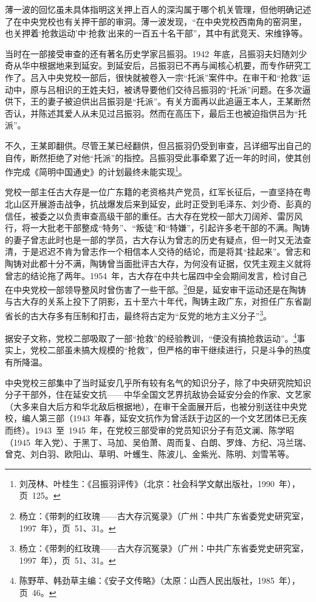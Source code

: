 薄一波的回忆虽未具体指明这关押上百人的深沟属于哪个机关管理，但他明确记述了在中央党校也有关押干部的审洞。薄一波发现，“在中央党校西南角的窑洞里，也关押着‘抢救运动’中‘抢救’出来的一百五十名干部”，其中有武竞天、宋维铮等。

当时在一部接受审查的还有著名历史学家吕振羽。1942~年底，吕振羽夫妇随刘少奇从华中根据地来到延安。到延安后，吕振羽已不再与闻核心机要，而专作研究工作了。吕入中央党校一部后，很快就被卷入一宗“托派”案件中。在审干和“抢救”运动中，原与吕相识的王姓夫妇，被诱导要他们交待吕振羽的“托派”问题。在多次逼供下，王的妻子被迫供出吕振羽是“托派”。有关方面再以此追逼王本人，王某断然否认，并陈述其爱人从未见过吕振羽。然而在高压下，最后王也被迫指供吕为“托派”。

不久，王某即翻供。尽管王某已经翻供，但吕振羽仍受到审查，吕详细写出自己的自传，断然拒绝了对他“托派”的指控。吕振羽受此事牵累了近一年的时间，使其创作完成《简明中国通史》的计划最终未能实现\footnote{刘茂林、叶桂生：《吕振羽评传》（北京：社会科学文献出版社，1990~年），页~125。}。

党校一部主任古大存是一位广东籍的老资格共产党员，红军长征后，一直坚持在粤北山区开展游击战争，抗战爆发后来到延安，此时正受到毛泽东、刘少奇、彭真的信任，被委之以负责审查高级干部的重任。古大存在党校一部大刀阔斧、雷厉风行，将一大批老干部整成“特务”、“叛徒”和“特嫌”，引起许多老干部的不满。陶铸的妻子曾志此时也是一部的学员，古大存认为曾志的历史有疑点，但一时又无法查清，于是迟迟不肯为曾志作一个相信本人交待的结论，而是将其“挂起来”。曾志和陶铸对此都十分不满，陶铸曾当面批评古大存，为何没有证据，仅凭主观主义就将曾志的结论拖了两年。1954~年，古大存在中共七届四中全会期间发言，检讨自己在中央党校一部领导整风时曾伤害了一些干部。\footnote{杨立：《带刺的红玫瑰——古大存沉冤录》（广州：中共广东省委党史研究室，1997~年），页~51、31。}但是，延安审干运动还是在陶铸与古大存的关系上投下了阴影，五十至六十年代，陶铸主政广东，对担任广东省副省长的古大存多有压制和打击，最终将古定为“反党的地方主义分子”\footnote{杨立：《带刺的红玫瑰——古大存沉冤录》（广州：中共广东省委党史研究室，1997~年），页~51、31。}。

据安子文称，党校二部吸取了一部“抢救”的经验教训，“便没有搞抢救运动”。\footnote{陈野苹、韩劲草主编：《安子文传略》（太原：山西人民出版社，1985~年），页~46。}事实上，党校二部虽未搞大规模的“抢救”，但严格的审干继续进行，只是斗争的热度有所降温。

中央党校三部集中了当时延安几乎所有较有名气的知识分子，除了中央研究院知识分子干部外，住在延安文抗——中华全国文艺界抗敌协会延安分会的作家、文艺家（大多来自大后方和华北敌后根据地），在审干全面展开后，也被分别送往中央党校，编人第三部（1943~年春，延安文抗作为曾活跃于边区的一个文艺团体已无疾而终）。1943~至~1945~年，在党校三部受审的党员知识分子有范文澜、陈学昭（1945~年入党）、于黑丁、马加、吴伯萧、周而复、白朗、罗烽、方纪、冯兰瑞、曾克、刘白羽、欧阳山、草明、叶蠖生、陈波儿、金紫光、陈明、刘雪苇等。

